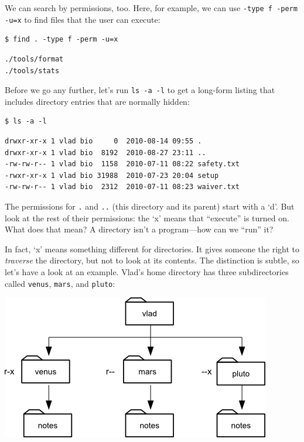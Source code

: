 \documentclass{book}
\begin{document}
We can search by permissions, too. Here, for example, we can use
\texttt{-type f -perm -u=x} to find files that the user can execute:

\begin{verbatim}
$ find . -type f -perm -u=x
\end{verbatim}

\begin{verbatim}
./tools/format
./tools/stats
\end{verbatim}

Before we go any further, let's run \texttt{ls -a -l} to get a long-form
listing that includes directory entries that are normally hidden:

\begin{verbatim}
$ ls -a -l
\end{verbatim}

\begin{verbatim}
drwxr-xr-x 1 vlad bio     0  2010-08-14 09:55 .
drwxr-xr-x 1 vlad bio  8192  2010-08-27 23:11 ..
-rw-rw-r-- 1 vlad bio  1158  2010-07-11 08:22 safety.txt
-rwxr-xr-x 1 vlad bio 31988  2010-07-23 20:04 setup
-rw-rw-r-- 1 vlad bio  2312  2010-07-11 08:23 waiver.txt
\end{verbatim}

The permissions for \texttt{.} and \texttt{..} (this directory and its
parent) start with a `d'. But look at the rest of their permissions: the
`x' means that ``execute'' is turned on. What does that mean? A
directory isn't a program---how can we ``run'' it?

In fact, `x' means something different for directories. It gives someone
the right to \emph{traverse} the directory, but not to look at its
contents. The distinction is subtle, so let's have a look at an example.
Vlad's home directory has three subdirectories called \texttt{venus},
\texttt{mars}, and \texttt{pluto}:

\includegraphics{novice/extras/img/x-for-directories.png}
\end{document}
